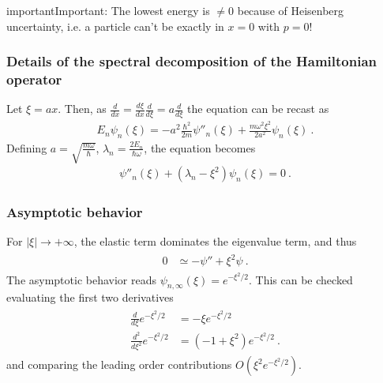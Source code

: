 \documentclass[letterpaper,10pt,english]{jupyterBook}
\begin{document}
\begin{sphinxadmonition}{important}{Important:}
\sphinxAtStartPar
The lowest energy is \(\neq0\) because of Heisenberg uncertainty, i.e. a particle can’t be exactly in \(x=0\) with \(p=0\)!
\end{sphinxadmonition}
\subsubsection*{Details of the spectral decomposition of the Hamiltonian operator}

\sphinxAtStartPar
Let \(\xi = a x\). Then, as \(\frac{d}{dx} = \frac{d \xi}{d x} \frac{d}{d \xi} = a \frac{d}{d \xi}\) the equation can be recast as
\begin{equation*}
\begin{split}E_n \psi_n(\xi) = - a^2 \frac{\hbar^2}{2 m} \psi''_n(\xi) + \frac{m \omega^2 \xi^2}{2 a^2} \psi_n(\xi) \ .\end{split}
\end{equation*}
\sphinxAtStartPar
Defining \(a = \sqrt{\frac{m \omega}{\hbar}}\), \(\lambda_n = \frac{2 E_n}{\hbar \omega}\), the equation becomes
\begin{equation*}
\begin{split}\psi''_n(\xi) + (\lambda_n - \xi^2) \psi_n(\xi) = 0 \ .\end{split}
\end{equation*}\subsubsection*{Asymptotic behavior}

\sphinxAtStartPar
For \(|\xi| \rightarrow +\infty\), the elastic term dominates the eigenvalue term, and thus
\begin{equation*}
\begin{split}\begin{aligned}
 0 
 & \simeq - \psi'' + \xi^2 \psi \ .
\end{aligned}\end{split}
\end{equation*}
\sphinxAtStartPar
The asymptotic behavior reads \(\psi_{n,\infty}(\xi) = e^{-\xi^2/2}\). This can be checked evaluating the first two derivatives
\begin{equation*}
\begin{split}\begin{aligned}
  \frac{d}{d\xi} e^{-\xi^2/2} & = - \xi e^{-\xi^2/2} \\
  \frac{d^2}{d\xi^2} e^{-\xi^2/2} & = \left( -1 + \xi^2 \right) e^{-\xi^2/2} \ .
\end{aligned}\end{split}
\end{equation*}
\sphinxAtStartPar
and comparing the leading order contributions \(O(\xi^2 e^{-\xi^2/2})\).
\end{document}

